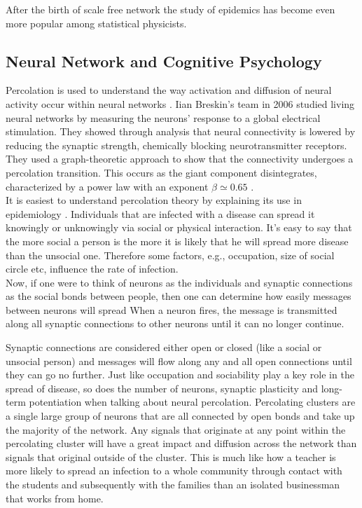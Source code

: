 	After the birth of scale free	network the study of epidemics has become even more popular among statistical physicists.
	
	
	\subsection{Neural Network and Cognitive Psychology}
	Percolation is used to understand the way activation and diffusion of neural activity occur within neural networks \cite{Friedenberg2011}. Iian Breskin's team in 2006 studied living neural networks by measuring the neurons' response to a global electrical stimulation. They showed through analysis that neural connectivity is lowered by reducing the synaptic strength, chemically blocking neurotransmitter receptors. They used a graph-theoretic approach to show that the connectivity undergoes a percolation transition. This occurs as the giant component disintegrates, characterized by a power law with an exponent $\beta \simeq 0.65$	 \cite{Breskin2006}.\\
	
	It is easiest to understand percolation theory by explaining its use in epidemiology \cite{Moore2000}. Individuals that are infected with a disease can spread it knowingly or unknowingly via social or physical interaction. It's easy to say that the more social a person is the more it is likely that he will spread more disease than the unsocial one. Therefore some factors, e.g., occupation, size of social circle etc, influence the rate of infection. \\
	
	
	Now, if one were to think of neurons as the individuals and synaptic connections as the social bonds between people, then one can determine how easily	messages between neurons will spread \cite{Friedenberg2011} When a neuron fires, the message is transmitted along	all synaptic connections to other neurons until it can no longer continue.
	
	 Synaptic connections are	considered either open or closed (like a social or unsocial person) and messages will flow along	any and all open connections until they can go no further. Just like occupation and sociability play	a key role in the spread of disease, so does the number of neurons, synaptic plasticity \cite{Hughes1958} and	long-term potentiation when talking about neural percolation. Percolating clusters are a single large	group of neurons that are all connected by open bonds and take up the majority of the network.	Any signals that originate at any point within the percolating cluster will have a great impact and	diffusion across the network than signals that original outside of the cluster.
	  This is much like	how a teacher is more likely to spread an infection to a whole community through contact with the	students and subsequently with the families than an isolated businessman that works from home.
	
